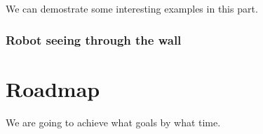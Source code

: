 \documentclass{article}
\begin{document}
We can demostrate some interesting examples in this part.

\subsubsection{Robot seeing through the wall}


\section{Roadmap}
\label{sec:roadmap}

We are going to achieve what goals by what time.





\small



\end{document}
